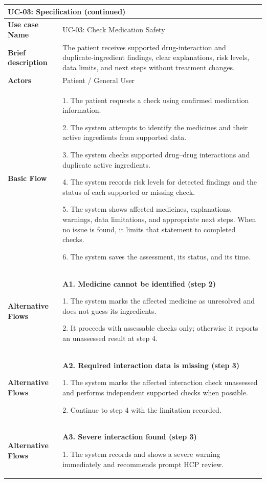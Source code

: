 \begin{longtable}{|p{}|p{}|}
\hline
\endfirsthead
\multicolumn{2}{l}{\textbf{UC-03: Specification (continued)}} \\
\hline
\endhead
\textbf{Use case Name} & UC-03: Check Medication Safety \\ \hline
\textbf{Brief description} & The patient receives supported drug-interaction and duplicate-ingredient findings, clear explanations, risk levels, data limits, and next steps without treatment changes. \\ \hline
\textbf{Actors} & Patient / General User \\ \hline
\textbf{Basic Flow} &
1. The patient requests a check using confirmed medication information.\par
2. The system attempts to identify the medicines and their active ingredients from supported data.\par
3. The system checks supported drug--drug interactions and duplicate active ingredients.\par
4. The system records risk levels for detected findings and the status of each supported or missing check.\par
5. The system shows affected medicines, explanations, warnings, data limitations, and appropriate next steps. When no issue is found, it limits that statement to completed checks.\par
6. The system saves the assessment, its status, and its time.
\\ \hline
\textbf{Alternative Flows} &
\textbf{A1. Medicine cannot be identified (step 2)}\par
1. The system marks the affected medicine as unresolved and does not guess its ingredients.\par
2. It proceeds with assessable checks only; otherwise it reports an unassessed result at step 4.
\\ \hline
\textbf{Alternative Flows} &
\textbf{A2. Required interaction data is missing (step 3)}\par
1. The system marks the affected interaction check unassessed and performs independent supported checks when possible.\par
2. Continue to step 4 with the limitation recorded.
\\ \hline
\textbf{Alternative Flows} &
\textbf{A3. Severe interaction found (step 3)}\par
1. The system records and shows a severe warning immediately and recommends prompt HCP review.\par

\end{longtable}
